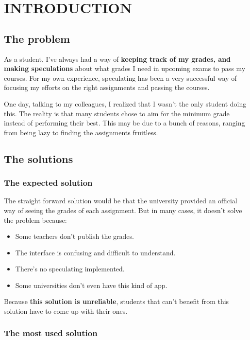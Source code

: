 \addchapheadtotoc
\chapter{INTRODUCTION} 
\label{chap:intro}

\section{The problem}
As a student, I've always had a way of \textbf{keeping track of my grades, and making speculations} about what grades I need in upcoming exams to pass my courses. For my own experience, speculating has been a very successful way of focusing my efforts on the right assignments and passing the courses. 

One day, talking to my colleagues, I realized that I wasn't the only student doing this. The reality is that many students chose to aim for the minimum grade instead of performing their best. This may be due to a bunch of reasons, ranging from being lazy to finding the assignments fruitless.

\newpage
\section{The solutions}

\subsection{The expected solution}

The straight forward solution would be that the university provided an official way of seeing the grades of each assignment. But in many cases, it doesn't solve the problem because:
\begin{itemize}[noitemsep]
    \item Some teachers don't publish the grades.
    \item The interface is confusing and difficult to understand.
    \item There's no speculating implemented.
    \item Some universities don't even have this kind of app.
\end{itemize}

Because \textbf{this solution is unreliable}, students that can't benefit from this solution have to come up with their ones.

\subsection{The most used solution}

